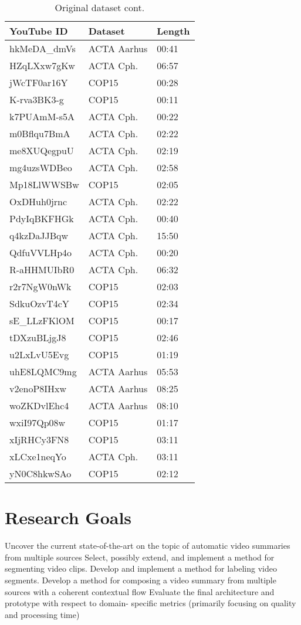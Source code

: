 \begin{table}[!ht]
	\begin{center}
	\caption{Original dataset cont.}
	\label{tab:orgdataset2}
		\begin{tabular}{lll}
		\toprule
			YouTube ID & Dataset & Length \\
			\midrule
			hkMeDA\_dmVs & ACTA Aarhus & 00:41 \\
			HZqLXxw7gKw & ACTA Cph. & 06:57 \\
			jWcTF0ar16Y & COP15 & 00:28 \\
			K-rva3BK3-g & COP15 & 00:11 \\
			k7PUAmM-s5A & ACTA Cph. & 00:22 \\
			m0Bflqu7BmA & ACTA Cph. & 02:22 \\
			me8XUQegpuU & ACTA Cph. & 02:19 \\
			mg4uzsWDBeo & ACTA Cph. & 02:58 \\
			Mp18LlWWSBw & COP15 & 02:05 \\
			OxDHuh0jrnc & ACTA Cph. & 02:22 \\
			PdyIqBKFHGk & ACTA Cph. & 00:40 \\
			q4kzDaJJBqw & ACTA Cph. & 15:50 \\
			QdfuVVLHp4o & ACTA Cph. & 00:20 \\
			R-aHHMUIbR0 & ACTA Cph. & 06:32 \\
			r2r7NgW0nWk & COP15 & 02:03 \\
			SdkuOzvT4cY & COP15 & 02:34 \\
			sE\_LLzFKlOM & COP15 & 00:17 \\
			tDXzuBLjgJ8 & COP15 & 02:46 \\
			u2LxLvU5Evg & COP15 & 01:19 \\
			uhE8LQMC9mg & ACTA Aarhus & 05:53 \\
			v2enoP8IHxw & ACTA Aarhus & 08:25 \\
			woZKDvlEhc4 & ACTA Aarhus & 08:10 \\
			wxiI97Qp08w & COP15 & 01:17 \\
			xIjRHCy3FN8 & COP15 & 03:11 \\
			xLCxe1neqYo & ACTA Cph. & 03:11 \\
			yN0C8hkwSAo & COP15 & 02:12 \\
		\bottomrule
		\end{tabular}
	\end{center}
\end{table}
%
\section{Research Goals}
%
Uncover the current state-of-the-art on the topic of automatic video summaries from multiple sources
Select, possibly extend, and implement a method for segmenting video clips.
Develop and implement a method for labeling video segments.
Develop a method for composing a video summary from multiple sources with a coherent contextual flow
Evaluate the final architecture and prototype with respect to domain- specific metrics (primarily focusing on quality and processing time)
%